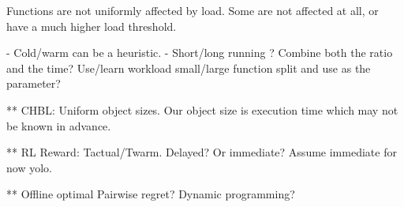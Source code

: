 
Functions are not uniformly affected by load. Some are not affected at all, or have a much higher load threshold.

- Cold/warm can be a heuristic.
- Short/long running ? Combine both the ratio and the time? Use/learn workload small/large function split and use as the parameter? 



** CHBL: Uniform object sizes. Our object size is execution time which may not be known in advance.

** RL
Reward: Tactual/Twarm. Delayed? Or immediate? Assume immediate for now yolo.

** Offline optimal
Pairwise regret?
Dynamic programming? 


